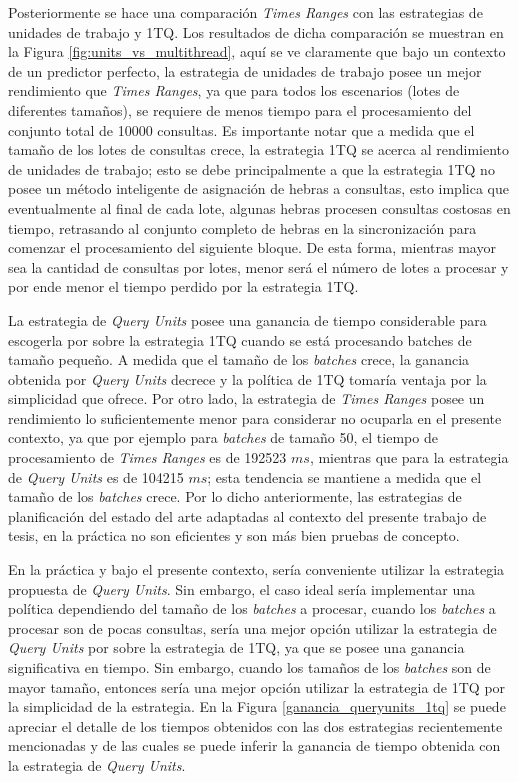 Posteriormente se hace una comparación \textit{Times Ranges} con las estrategias de unidades de trabajo y 1TQ. Los resultados de dicha comparación se muestran en la Figura \ref{fig:units_vs_multithread}, aquí se ve claramente que bajo un contexto de un predictor perfecto, la estrategia de unidades de trabajo posee un mejor rendimiento que \textit{Times Ranges}, ya que para todos los escenarios (lotes de diferentes tamaños), se requiere de menos tiempo para el procesamiento del conjunto total de 10000 consultas.
Es importante notar que a medida que el tamaño de los lotes de consultas crece, la estrategia 1TQ se acerca al rendimiento de unidades de trabajo; esto se debe principalmente a que la estrategia 1TQ no posee un método inteligente de asignación de hebras a consultas, esto implica que eventualmente al final de cada lote, algunas hebras procesen consultas costosas en tiempo, retrasando al conjunto completo de hebras en la sincronización para comenzar el procesamiento del siguiente bloque. De esta forma, mientras mayor sea la cantidad de consultas por lotes, menor será el número de lotes a procesar y por ende menor el tiempo perdido por la estrategia 1TQ.  

La estrategia de \textit{Query Units} posee una ganancia de tiempo considerable para escogerla por sobre la estrategia 1TQ cuando se está procesando batches de tamaño pequeño. A medida que el tamaño de los \textit{batches} crece, la ganancia obtenida por \textit{Query Units} decrece y la política de 1TQ tomaría ventaja por la simplicidad que ofrece. Por otro lado, la estrategia de \textit{Times Ranges} posee un rendimiento lo suficientemente menor para considerar no ocuparla en el presente contexto, ya que por ejemplo para \textit{batches} de tamaño 50, el tiempo de procesamiento de \textit{Times Ranges} es de 192523 $ms$, mientras que para la estrategia de \textit{Query Units} es de 104215 $ms$; esta tendencia se mantiene a medida que el tamaño de los \textit{batches} crece. Por lo dicho anteriormente, las estrategias de planificación del estado del arte adaptadas al contexto del presente trabajo de tesis, en la práctica no son eficientes y son más bien pruebas de concepto.

En la práctica y bajo el presente contexto, sería conveniente utilizar la estrategia propuesta de \textit{Query Units}. Sin embargo, el caso ideal sería implementar una política dependiendo del tamaño de los \textit{batches} a procesar, cuando los \textit{batches} a procesar son de pocas consultas, sería una mejor opción utilizar la estrategia de \textit{Query Units} por sobre la estrategia de 1TQ, ya que se posee una ganancia significativa en tiempo. Sin embargo, cuando los tamaños de los \textit{batches} son de mayor tamaño, entonces sería una mejor opción utilizar la estrategia de 1TQ por la simplicidad de la estrategia. En la Figura \ref{ganancia_queryunits_1tq} se puede apreciar el detalle de los tiempos obtenidos con las dos estrategias recientemente mencionadas y de las cuales se puede inferir la ganancia de tiempo obtenida con la estrategia de \textit{Query Units}. 

